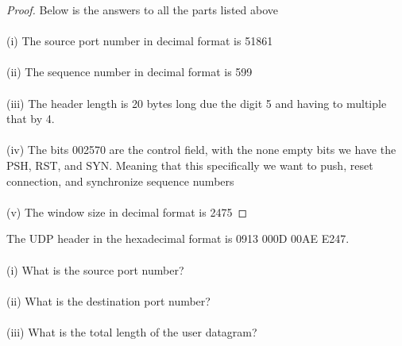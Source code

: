 \documentclass[12pt]{article}
\newenvironment{exercise}[2][Exercise]{\begin{trivlist}
\item[\hskip \labelsep {\bfseries #1}\hskip \labelsep {\bfseries #2.}]}{\end{trivlist}}
\begin{document}
\begin{proof}
Below is the answers to all the parts listed above \\ \\
(i) The source port number in decimal format is 51861 \\ \\ 
(ii) The sequence number in decimal format is 599 \\ \\
(iii) The header length is 20 bytes long due the digit 5 and having to multiple that by 4. \\ \\
(iv) The bits 002570 are the control field, with the none empty bits we have the PSH, RST, and SYN. Meaning that this specifically we want to push, reset connection, and synchronize sequence numbers\\ \\
(v) The window size in decimal format is 2475
\end{proof}

\begin{exercise}{16}
The UDP header in the hexadecimal format is 0913 000D 00AE E247. \\ \\
(i) What is the source port number? \\ \\
(ii) What is the destination port number? \\ \\
(iii) What is the total length of the user datagram? 
\end{exercise}
\end{document}

